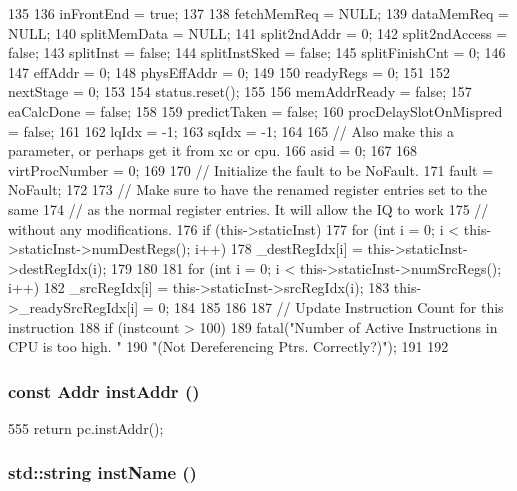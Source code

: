 \begin{DoxyCode}
135 {
136     inFrontEnd = true;
137 
138     fetchMemReq = NULL;
139     dataMemReq = NULL;
140     splitMemData = NULL;
141     split2ndAddr = 0;
142     split2ndAccess = false;
143     splitInst = false;
144     splitInstSked = false;    
145     splitFinishCnt = 0;
146     
147     effAddr = 0;
148     physEffAddr = 0;
149 
150     readyRegs = 0;
151 
152     nextStage = 0;
153 
154     status.reset();
155 
156     memAddrReady = false;
157     eaCalcDone = false;
158 
159     predictTaken = false;
160     procDelaySlotOnMispred = false;
161 
162     lqIdx = -1;
163     sqIdx = -1;
164 
165     // Also make this a parameter, or perhaps get it from xc or cpu.
166     asid = 0;
167 
168     virtProcNumber = 0;
169 
170     // Initialize the fault to be NoFault.
171     fault = NoFault;
172 
173     // Make sure to have the renamed register entries set to the same
174     // as the normal register entries.  It will allow the IQ to work
175     // without any modifications.
176     if (this->staticInst) {
177         for (int i = 0; i < this->staticInst->numDestRegs(); i++) {
178             _destRegIdx[i] = this->staticInst->destRegIdx(i);
179         }
180 
181         for (int i = 0; i < this->staticInst->numSrcRegs(); i++) {
182             _srcRegIdx[i] = this->staticInst->srcRegIdx(i);
183             this->_readySrcRegIdx[i] = 0;
184         }
185     }
186 
187     // Update Instruction Count for this instruction
188     if (instcount > 100) {
189         fatal("Number of Active Instructions in CPU is too high. "
190                 "(Not Dereferencing Ptrs. Correctly?)\n");
191     }
192 }
\end{DoxyCode}
\hypertarget{classInOrderDynInst_aec0a3c3b48572089565d1b1652bfcac3}{
\subsubsection[{instAddr}]{\setlength{\rightskip}{0pt plus 5cm}const {\bf Addr} instAddr ()}}
\label{classInOrderDynInst_aec0a3c3b48572089565d1b1652bfcac3}



\begin{DoxyCode}
555 { return pc.instAddr(); }
\end{DoxyCode}
\hypertarget{classInOrderDynInst_af9ac6eff5f99a7cc559c32d473e417ab}{
\subsubsection[{instName}]{\setlength{\rightskip}{0pt plus 5cm}std::string instName ()}}
\label{classInOrderDynInst_af9ac6eff5f99a7cc559c32d473e417ab}



